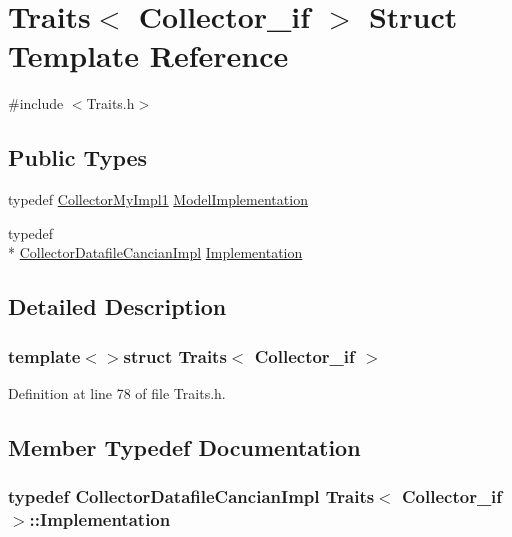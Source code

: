 \hypertarget{struct_traits_3_01_collector__if_01_4}{\section{Traits$<$ Collector\-\_\-if $>$ Struct Template Reference}
\label{struct_traits_3_01_collector__if_01_4}
}


{\ttfamily \#include $<$Traits.\-h$>$}

\subsection*{Public Types}
\begin{DoxyCompactItemize}
\item 
typedef \hyperlink{class_collector_my_impl1}{Collector\-My\-Impl1} \hyperlink{struct_traits_3_01_collector__if_01_4_a38ef8e0ef3488a361965174720a895ae}{Model\-Implementation}
\item 
typedef \\*
\hyperlink{class_collector_datafile_cancian_impl}{Collector\-Datafile\-Cancian\-Impl} \hyperlink{struct_traits_3_01_collector__if_01_4_ace32b8f4a29ef663d7f4dcf5e0971ef8}{Implementation}
\end{DoxyCompactItemize}


\subsection{Detailed Description}
\subsubsection*{template$<$$>$struct Traits$<$ Collector\-\_\-if $>$}



Definition at line 78 of file Traits.\-h.



\subsection{Member Typedef Documentation}
\hypertarget{struct_traits_3_01_collector__if_01_4_ace32b8f4a29ef663d7f4dcf5e0971ef8}{
\subsubsection[{Implementation}]{\setlength{\rightskip}{0pt plus 5cm}typedef {\bf Collector\-Datafile\-Cancian\-Impl} {\bf Traits}$<$ {\bf Collector\-\_\-if} $>$\-::{\bf Implementation}}}\label{struct_traits_3_01_collector__if_01_4_ace32b8f4a29ef663d7f4dcf5e0971ef8}


